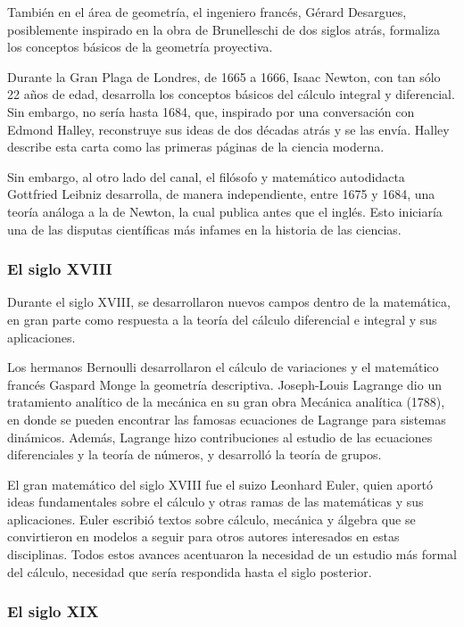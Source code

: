 También en el área de geometría, el ingeniero francés, Gérard Desargues, posiblemente inspirado en la obra de Brunelleschi de dos siglos atrás, formaliza los conceptos básicos de la geometría proyectiva.

Durante la Gran Plaga de Londres, de 1665 a 1666, Isaac Newton, con tan sólo 22 años de edad, desarrolla los conceptos básicos del cálculo integral y diferencial. Sin embargo, no sería hasta 1684, que, inspirado por una conversación con Edmond Halley, reconstruye sus ideas de dos décadas atrás y se las envía. Halley describe esta carta como las primeras páginas de la ciencia moderna. 

Sin embargo, al otro lado del canal, el filósofo y matemático autodidacta Gottfried Leibniz desarrolla, de manera independiente, entre 1675 y 1684, una teoría análoga a la de Newton, la cual publica antes que el inglés. Esto iniciaría una de las disputas científicas más infames en la historia de las ciencias. 

\subsubsection*{El siglo XVIII}

Durante el siglo XVIII, se desarrollaron nuevos campos dentro de la matemática, en gran parte como respuesta a la teoría del cálculo diferencial e integral y sus aplicaciones.

Los hermanos Bernoulli desarrollaron el cálculo de variaciones y el matemático francés Gaspard Monge la geometría descriptiva. Joseph-Louis Lagrange dio un tratamiento analítico de la mecánica en su gran obra Mecánica analítica (1788), en donde se pueden encontrar las famosas ecuaciones de Lagrange para sistemas dinámicos. Además, Lagrange hizo contribuciones al estudio de las ecuaciones diferenciales y la teoría de números, y desarrolló la teoría de grupos. 

El gran matemático del siglo XVIII fue el suizo Leonhard Euler, quien aportó ideas fundamentales sobre el cálculo y otras ramas de las matemáticas y sus aplicaciones. Euler escribió textos
sobre cálculo, mecánica y álgebra que se convirtieron en modelos a seguir para otros autores interesados en estas disciplinas. Todos estos avances acentuaron la necesidad de un estudio más formal
del cálculo, necesidad que sería respondida hasta el siglo posterior. 

\subsubsection*{El siglo XIX}

